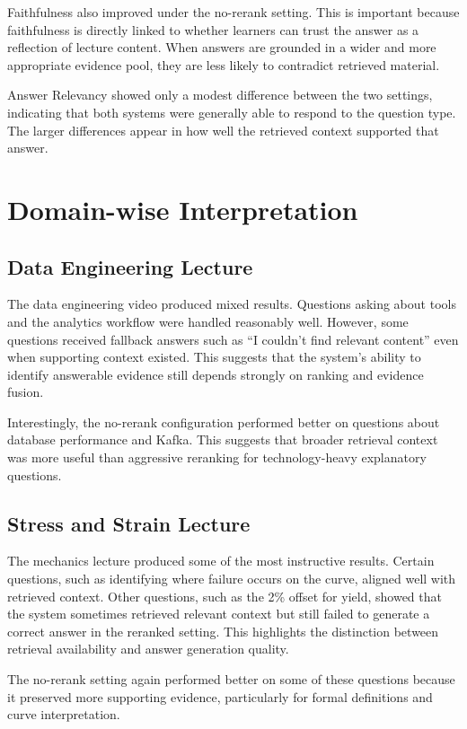 \documentclass[12pt,a4paper,oneside]{report}
\begin{document}
Faithfulness also improved under the no-rerank setting. This is important because faithfulness is directly linked to whether learners can trust the answer as a reflection of lecture content. When answers are grounded in a wider and more appropriate evidence pool, they are less likely to contradict retrieved material.

Answer Relevancy showed only a modest difference between the two settings, indicating that both systems were generally able to respond to the question type. The larger differences appear in how well the retrieved context supported that answer.

\section{Domain-wise Interpretation}
\subsection{Data Engineering Lecture}
The data engineering video produced mixed results. Questions asking about tools and the analytics workflow were handled reasonably well. However, some questions received fallback answers such as ``I couldn't find relevant content'' even when supporting context existed. This suggests that the system's ability to identify answerable evidence still depends strongly on ranking and evidence fusion.

Interestingly, the no-rerank configuration performed better on questions about database performance and Kafka. This suggests that broader retrieval context was more useful than aggressive reranking for technology-heavy explanatory questions.

\subsection{Stress and Strain Lecture}
The mechanics lecture produced some of the most instructive results. Certain questions, such as identifying where failure occurs on the curve, aligned well with retrieved context. Other questions, such as the 2\% offset for yield, showed that the system sometimes retrieved relevant context but still failed to generate a correct answer in the reranked setting. This highlights the distinction between retrieval availability and answer generation quality.

The no-rerank setting again performed better on some of these questions because it preserved more supporting evidence, particularly for formal definitions and curve interpretation.
\end{document}
